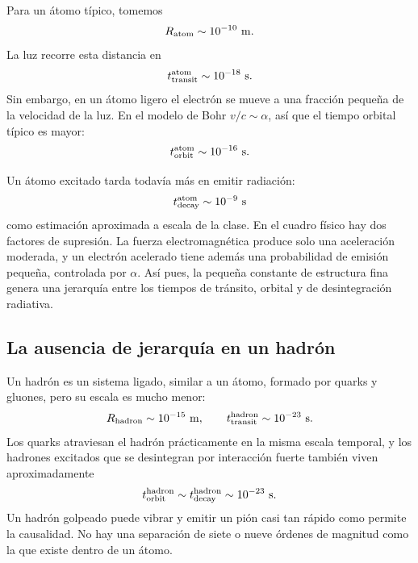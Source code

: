 Para un átomo típico, tomemos
\begin{equation}
R_{\rm atom}\sim10^{-10}\ {\rm m}.
\end{equation}
La luz recorre esta distancia en
\begin{equation}
t_{\rm transit}^{\rm atom}\sim10^{-18}\ {\rm s}.
\end{equation}
Sin embargo, en un átomo ligero el electrón se mueve a una fracción pequeña de la velocidad de la luz. En el modelo de Bohr \(v/c\sim\alpha\), así que el tiempo orbital típico es mayor:
\begin{equation}
t_{\rm orbit}^{\rm atom}\sim10^{-16}\ {\rm s}.
\end{equation}

Un átomo excitado tarda todavía más en emitir radiación:
\begin{equation}
t_{\rm decay}^{\rm atom}\sim10^{-9}\ {\rm s}
\end{equation}
como estimación aproximada a escala de la clase. En el cuadro físico hay dos factores de supresión. La fuerza electromagnética produce solo una aceleración moderada, y un electrón acelerado tiene además una probabilidad de emisión pequeña, controlada por \(\alpha\). Así pues, la pequeña constante de estructura fina genera una jerarquía entre los tiempos de tránsito, orbital y de desintegración radiativa.

\subsection{La ausencia de jerarquía en un hadrón}

Un hadrón es un sistema ligado, similar a un átomo, formado por quarks y gluones, pero su escala es mucho menor:
\begin{equation}
R_{\rm hadron}\sim10^{-15}\ {\rm m},
\qquad
t_{\rm transit}^{\rm hadron}\sim10^{-23}\ {\rm s}.
\end{equation}
Los quarks atraviesan el hadrón prácticamente en la misma escala temporal, y los hadrones excitados que se desintegran por interacción fuerte también viven aproximadamente
\begin{equation}
t_{\rm orbit}^{\rm hadron}
\sim t_{\rm decay}^{\rm hadron}
\sim10^{-23}\ {\rm s}.
\end{equation}
Un hadrón golpeado puede vibrar y emitir un pión casi tan rápido como permite la causalidad. No hay una separación de siete o nueve órdenes de magnitud como la que existe dentro de un átomo.

\begin{classroomqa}\end{classroomqa}

